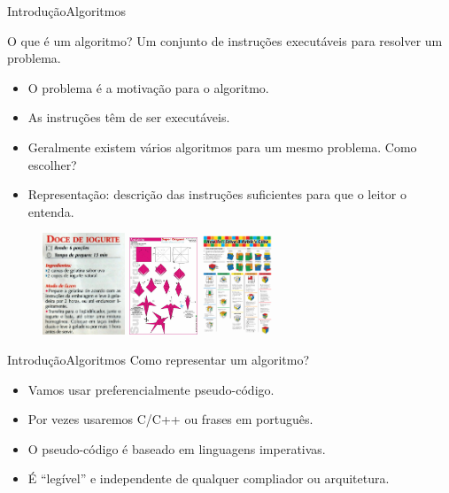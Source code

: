 \documentclass[aspectratio=169]{beamer}
\begin{document}
\begin{frame}{Introdução}{Algoritmos}
\begin{block}{O que é um algoritmo?}{
Um conjunto de instruções executáveis para resolver um problema.}
\end{block}
\begin{itemize}
\item O problema é a motivação para o algoritmo.
\item As instruções têm de ser executáveis.
\item Geralmente existem vários algoritmos para um mesmo problema. Como escolher?
\item Representação: descrição das instruções suficientes para que o leitor o entenda.
\end{itemize}
\begin{figure}[!ht]
  \includegraphics[width=70pt]{imgs/receita.jpg}
  \includegraphics[width=58pt]{imgs/origami.jpg}
  \includegraphics[width=60pt]{imgs/cubo.jpg}
\end{figure}
\end{frame}


\begin{frame}{Introdução}{Algoritmos}
Como representar um algoritmo?
\begin{itemize}
\item Vamos usar preferencialmente pseudo-código.
\item Por vezes usaremos C/C++ ou frases em português.
\item O pseudo-código é baseado em linguagens imperativas. 
\item É ``legível'' e  independente de qualquer compliador ou arquitetura.
\end{itemize}
\end{frame}
\end{document}
